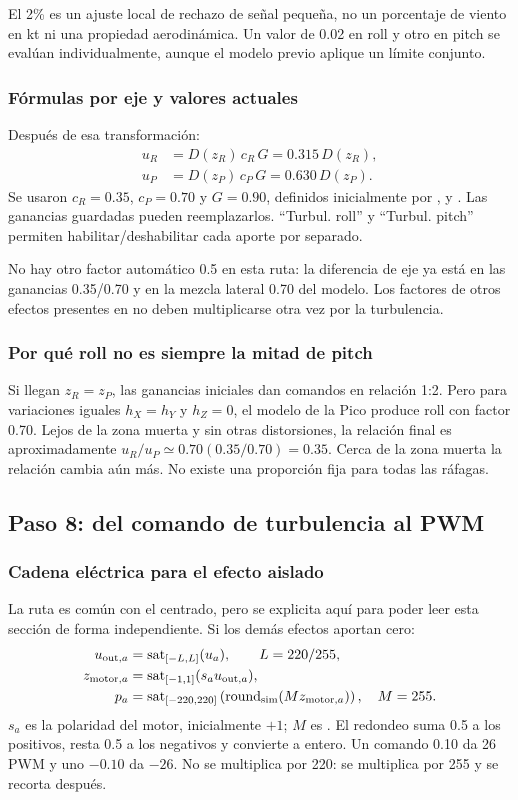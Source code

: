 El 2\% es un ajuste local de rechazo de señal pequeña, no un porcentaje de viento en kt ni una propiedad aerodinámica. Un valor de 0.02 en roll y otro en pitch se evalúan individualmente, aunque el modelo previo aplique un límite conjunto.

\subsubsection{Fórmulas por eje y valores actuales}
Después de esa transformación:
\begin{align}
u_R&=D(z_R)\,c_R\,G=0.315\,D(z_R),\\
u_P&=D(z_P)\,c_P\,G=0.630\,D(z_P).
\label{eq:turb-firmware}
\end{align}
Se usaron $c_R=0.35$, $c_P=0.70$ y $G=0.90$, definidos inicialmente por ,  y . Las ganancias guardadas pueden reemplazarlos. ``Turbul. roll'' y ``Turbul. pitch'' permiten habilitar/deshabilitar cada aporte por separado.

No hay otro factor automático 0.5 en esta ruta: la diferencia de eje ya está en las ganancias 0.35/0.70 y en la mezcla lateral 0.70 del modelo. Los factores de otros efectos presentes en  no deben multiplicarse otra vez por la turbulencia.

\subsubsection{Por qué roll no es siempre la mitad de pitch}
Si llegan $z_R=z_P$, las ganancias iniciales dan comandos en relación 1:2. Pero para variaciones iguales $h_X=h_Y$ y $h_Z=0$, el modelo de la Pico produce roll con factor 0.70. Lejos de la zona muerta y sin otras distorsiones, la relación final es aproximadamente $u_R/u_P\simeq0.70(0.35/0.70)=0.35$. Cerca de la zona muerta la relación cambia aún más. No existe una proporción fija para todas las ráfagas.

\subsection{Paso 8: del comando de turbulencia al PWM}
\subsubsection{Cadena eléctrica para el efecto aislado}
La ruta es común con el centrado, pero se explicita aquí para poder leer esta sección de forma independiente. Si los demás efectos aportan cero:
\begin{align}
u_{{\rm out},a}&=\operatorname{sat}_{[-L,L]}(u_a),\qquad L=220/255,\\
z_{{\rm motor},a}&=\operatorname{sat}_{[-1,1]}(s_a u_{{\rm out},a}),\\
p_a&=\operatorname{sat}_{[-220,220]}\left(
\operatorname{round}_{\rm sim}(M z_{{\rm motor},a})\right),\quad M=255.
\end{align}
$s_a$ es la polaridad del motor, inicialmente $+1$; $M$ es . El redondeo suma 0.5 a los positivos, resta 0.5 a los negativos y convierte a entero. Un comando 0.10 da 26 PWM y uno $-0.10$ da $-26$. No se multiplica por 220: se multiplica por 255 y se recorta después.

